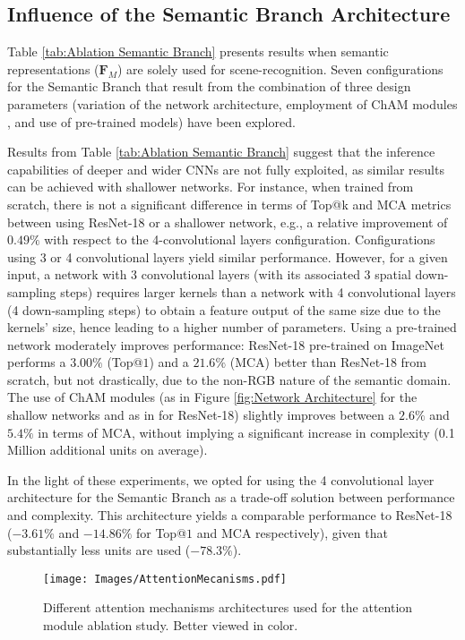 \documentclass[review, 3p, sort&compress]{elsarticle}
\begin{document}
\subsection*{Influence of the Semantic Branch Architecture}
Table \ref{tab:Ablation Semantic Branch} presents results when semantic representations (\(\textbf{F}_M\)) are solely used for scene-recognition. Seven configurations for the Semantic Branch that result from the combination of three design parameters (variation of the network architecture, employment of ChAM modules \cite{woo2018cbam}, and use of pre-trained models) have been explored.

Results from Table \ref{tab:Ablation Semantic Branch} suggest that the inference capabilities of deeper and wider CNNs are not fully exploited, as similar results can be achieved with shallower networks. For instance, when trained from scratch, there is not a significant difference in terms of Top@k and MCA metrics between using ResNet-18 or a shallower network, e.g., a relative improvement of \(0.49\%\) with respect to the 4-convolutional layers configuration. Configurations using 3 or 4 convolutional layers yield similar performance. However, for a given input, a network with 3 convolutional layers (with its associated 3 spatial down-sampling steps) requires larger kernels than a network with 4 convolutional layers (4 down-sampling steps) to obtain a feature output of the same size due to the kernels' size, hence leading to a higher number of parameters. Using a pre-trained network moderately improves performance: ResNet-18 pre-trained on ImageNet performs a \(3.00\%\) (Top@\(1\)) and a \(21.6\%\) (MCA) better than ResNet-18 from scratch, but not drastically, due to the non-RGB nature of the semantic domain. The use of ChAM modules (as in Figure \ref{fig:Network Architecture} for the shallow networks and as in \cite{woo2018cbam} for ResNet-18) slightly improves between a \(2.6\%\) and \(5.4\%\) in terms of MCA, without implying a significant increase in complexity (0.1 Million additional units on average). 

In the light of these experiments, we opted for using the 4 convolutional layer architecture for the Semantic Branch as a trade-off solution between performance and complexity. This architecture yields a comparable performance to ResNet-18 (\(-3.61\%\) and \(-14.86\%\) for Top@\(1\) and MCA respectively), given that substantially less units are used (\(-78.3\%\)).

\begin{figure}[t!]
    \centering
    \texttt{[image: Images/AttentionMecanisms.pdf]}
    \caption{Different attention mechanisms architectures used for the attention module ablation study. Better viewed in color.}
    \label{fig:Attention Mechanisms}
\end{figure}
\end{document}
